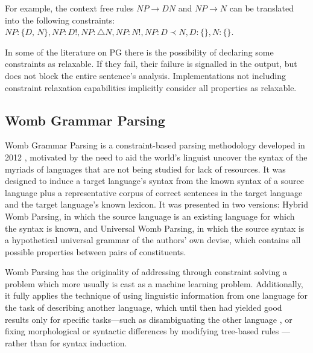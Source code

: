 \documentclass{llncs}
\newcommand{\constituency}[2]{\textit{#1} : \textit{#2}}
\newcommand{\obligation}[2]{\textit{#1} : \triangle \textit{#2}}
\newcommand{\uniqueness}[2]{\textit{#1} : \textit{#2} !}
\newcommand{\precedence}[3]{\textit{#1} : \textit{#2} \prec \textit{#3}}
\begin{document}
\begin{example} For example, the context free rules $\textit{NP}\to D N$ and $\textit{NP} \to N$ can be translated into the following constraints: $\constituency{NP}{\{D, N\}}, \uniqueness{NP}{D}, \obligation{NP}{N}, \uniqueness{NP}{N}, \precedence{NP}{D}{N}, \constituency{D}{\{\}}, \constituency{N}{\{\}}$.

\end{example}

%
In some of the literature on PG there is the possibility of declaring some constraints as relaxable. If they fail, their failure  is signalled in the output, but does not block the entire sentence's analysis.  Implementations not including constraint relaxation capabilities implicitly consider all properties as relaxable.


 
%
\subsection{Womb Grammar Parsing}

%
 Womb Grammar Parsing   is a constraint-based parsing methodology developed in 2012 \cite {DM12}, motivated by the need to aid the world's linguist uncover the syntax of the myriads of languages that are not being studied for lack of resources.
It was designed to induce a target language's syntax from the known syntax of a source language plus a representative corpus of correct sentences in the target language and the target language's known lexicon.  It was presented in two versions: Hybrid Womb Parsing, in which the source language is an existing language for which the syntax is known, and Universal Womb Parsing,  in which the source syntax is a hypothetical universal grammar of the authors' own devise, which contains all possible properties between pairs of constituents.

Womb Parsing has the originality of addressing through constraint solving a problem  which more usually is cast as a machine learning problem. Additionally, it fully applies the technique of using  linguistic information from one language for the task of describing another language, which until then had  yielded good results only for specific tasks---such as disambiguating the other language \cite{BurkKlein:2008}, or fixing morphological or syntactic differences by modifying tree-based rules \cite{Nicolas:towardsefficient}---rather than for syntax induction.
\end{document}
